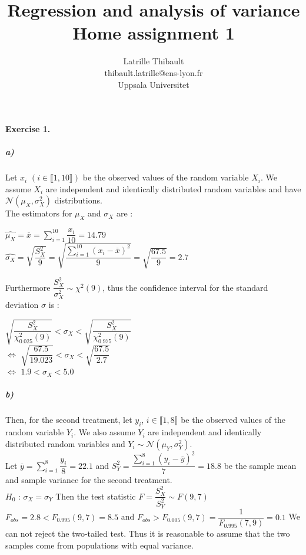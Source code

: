 \documentclass{article}
\author{Latrille Thibault\\
\small thibault.latrille@ens-lyon.fr\\[-0.8ex]
\small Uppsala Universitet\\}
\title{Regression and analysis of variance \\ Home assignment 1}
\begin{document}
\maketitle
\paragraph{Exercise 1.}
\subparagraph{a)}


Let $x_i$ $(i  \in \llbracket 1,10 \rrbracket)$ be the observed values of the random variable $X_i$. We assume $X_i$ are independent and identically distributed random variables and have $\mathcal{N}(\mu_X,\sigma_X^2)$ distributions. \\
The estimators for $\mu_X$ and $\sigma_X$ are : 
\begin{center}

$\displaystyle \widehat{\mu_X}=\overline{x} = \sum_{i=1}^{10} \dfrac{x_i}{10} = 14.79$ \\
$\displaystyle \widehat{\sigma_X}=\sqrt{\dfrac{S_X^2}{9}} = \sqrt{\dfrac{\sum_{i=1}^{10} (x_i-\overline{x})^2}{9}} = \sqrt{\dfrac{67.5}{9}}= 2.7
$ 

\end{center}
Furthermore $\dfrac{S_X^2}{\sigma_X^2} \sim \chi^2(9)$, thus the confidence interval for the standard deviation $\sigma$ is : 
\begin{center}
$\sqrt{\dfrac{S_X^2}{\chi^2_{0.025}(9)}} < \sigma_X < \sqrt{\dfrac{S_X^2}{\chi^2_{0.975}(9)}} $\\ $\Leftrightarrow$ $\sqrt{\dfrac{67.5}{19.023}} < \sigma_X < \sqrt{\dfrac{67.5}{2.7}}$\\ $ \Leftrightarrow $ $ 1.9< \sigma_X <  5.0$

\end{center}
\subparagraph{b)}
Then, for the second treatment, let $y_i$, $i  \in \llbracket 1,8 \rrbracket$ be the observed values of the random variable $Y_i$. We also assume $Y_i$ are independent and identically distributed random variables and $Y_i \sim \mathcal{N}(\mu_Y,\sigma_Y^2)$. \\
Let $\overline{y} = \sum_{i=1}^{8} \dfrac{y_i}{8}=22.1 $ and $\displaystyle S_Y^2=\dfrac{\sum_{i=1}^{8} (y_i-\overline{y})^2}{7}=18.8 $ be the sample mean and sample variance for the second treatment.\\
 $H_0$ : $\sigma_X=\sigma_Y$
Then the test statistic $F=\dfrac{S_X^2}{S_Y^2} \sim F(9,7)$\\

$F_{obs}=2.8<F_{0.995}(9,7)=8.5$ and $F_{obs}>F_{0.005}(9,7)=\dfrac{1}{F_{0.995}(7,9)}=0.1$
We can not reject the two-tailed test. Thus it is reasonable to assume that the two samples come from populations with equal variance.
\end{document}
